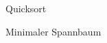 \documentclass{article}
\begin{document}
\begin{exercise}{Quicksort}


  \begin{solution}

  \end{solution}
\end{exercise}

\begin{exercise}{Minimaler Spannbaum}
  


  \begin{solution}

  \end{solution}
\end{exercise}
\end{document}
